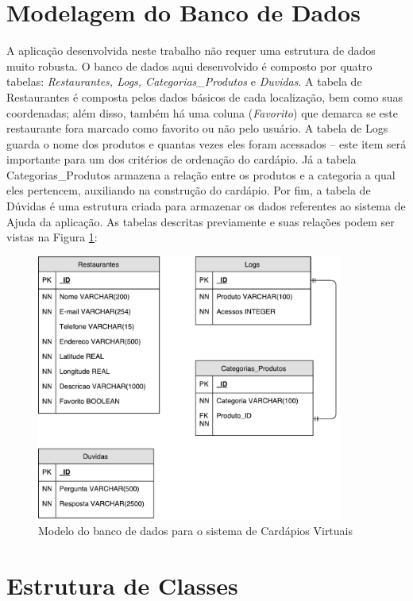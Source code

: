 \section{Modelagem do Banco de Dados}

A aplicação desenvolvida neste trabalho não requer uma estrutura de dados muito robusta. O banco de dados aqui desenvolvido é composto por quatro tabelas: \emph{Restaurantes, Logs, Categorias\_Produtos} e \emph{Duvidas}. A tabela de Restaurantes é composta pelos dados básicos de cada localização, bem como suas coordenadas; além disso, também há uma coluna (\emph{Favorito}) que demarca se este restaurante fora marcado como favorito ou não pelo usuário. A tabela de Logs guarda o nome dos produtos e quantas vezes eles foram acessados -- este item será importante para um dos critérios de ordenação do cardápio. Já a tabela Categorias\_Produtos armazena a relação entre os produtos e a categoria a qual eles pertencem, auxiliando na construção do cardápio. Por fim, a tabela de Dúvidas é uma estrutura criada para armazenar os dados referentes ao sistema de Ajuda da aplicação. As tabelas descritas previamente e suas relações podem ser vistas na Figura \ref{fig:bd}:

\begin{figure}[H]
	\centering
	\caption[Modelagem do Banco de Dados]{\label{fig:bd}Modelo do banco de dados para o sistema de Cardápios Virtuais}
	\includegraphics[width=0.9\textwidth]{./pdf/bd.pdf}
\end{figure}

\section{Estrutura de Classes}


